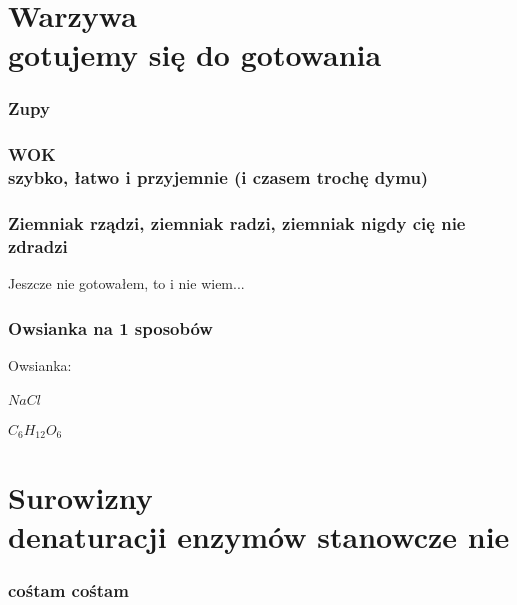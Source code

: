 \documentclass[KNIGA.tex]{subfiles}
\begin{document}
\maketitle{}

\part{Warzywa\\
\normalsize{gotujemy się do gotowania}}

\section{Zupy}


\section{WOK\\
\normalsize{szybko, łatwo i przyjemnie (i czasem trochę dymu)}}
%

\section{Ziemniak rządzi, ziemniak radzi, ziemniak nigdy cię nie zdradzi}


\subparagraph{Jeszcze nie gotowałem, to i nie wiem...}

\section{Owsianka na 1 sposobów}
\subparagraph{Owsianka:}
\subsection{$NaCl$}


\subsection{$C_6H_{12}O_6$}

\part{Surowizny\\
\normalsize{denaturacji enzymów stanowcze nie}}
\section{cośtam cośtam}
\tableofcontents
\end{document}
